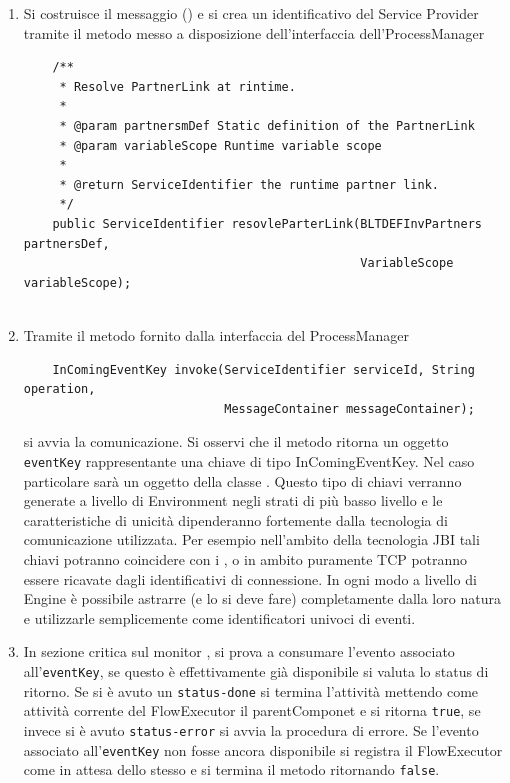 \begin{enumerate}
  \item Si costruisce il messaggio () e si crea un
  identificativo del Service Provider tramite il metodo messo a disposizione
  dell'interfaccia dell'ProcessManager
  \lstset{frame=NONE}
  \begin{lstlisting}
  	/**
     * Resolve PartnerLink at rintime.
     * 
     * @param partnersmDef Static definition of the PartnerLink
     * @param variableScope Runtime variable scope
     * 
     * @return ServiceIdentifier the runtime partner link.
     */
    public ServiceIdentifier resovleParterLink(BLTDEFInvPartners partnersDef, 
											   VariableScope variableScope);
    
  \end{lstlisting}  
  
  \item Tramite il metodo fornito dalla interfaccia del ProcessManager
  \begin{lstlisting}
  	InComingEventKey invoke(ServiceIdentifier serviceId, String operation, 
							MessageContainer messageContainer);
  \end{lstlisting}
  si avvia la comunicazione. Si osservi che il metodo ritorna un oggetto
  \texttt{eventKey} rappresentante una chiave di tipo InComingEventKey. 
  Nel caso particolare sarà un oggetto della classe
  . Questo tipo di chiavi verranno generate a
 livello di Environment negli strati di più basso livello e le
 caratteristiche di unicità dipenderanno fortemente dalla tecnologia di comunicazione
 utilizzata. Per esempio nell'ambito della tecnologia JBI tali chiavi potranno
 coincidere con i , o in ambito puramente TCP potranno
 essere ricavate dagli identificativi di connessione. In ogni modo a livello di Engine
 \`e possibile astrarre (e lo si deve fare) completamente dalla loro natura e
 utilizzarle semplicemente come identificatori univoci di eventi.
  
  \item In sezione critica sul monitor , si
  prova a consumare l'evento associato all'\texttt{eventKey}, se questo \`e
  effettivamente già disponibile si valuta lo status di ritorno. Se si \`e
  avuto un \texttt{status-done} si termina l'attività mettendo come
  attività corrente del FlowExecutor il parentComponet e si ritorna
  \texttt{true}, se invece si \`e avuto \texttt{status-error} si avvia la
  procedura di errore. Se l'evento associato all'\texttt{eventKey} non fosse
  ancora disponibile si registra il FlowExecutor come in attesa dello stesso e
  si termina il metodo  ritornando \texttt{false}.
  

\end{enumerate}
